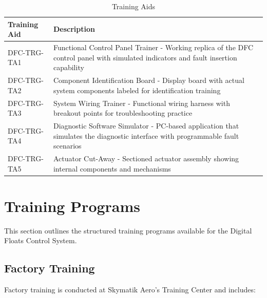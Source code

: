 \documentclass[12pt,a4paper,twoside,openright]{book}
\newcommand{\tabletextfont}{\normalfont\rmfamily}
\newcommand{\tableheadfont}{\normalfont\bfseries}
\begin{document}
\begin{table}[h]
\centering
\setlength{\tabcolsep}{5pt} %
\begin{tabular}{|p{}|p{}|}
\hline
\tableheadfont\textbf{Training Aid} & \tableheadfont\textbf{Description} \\
\hline
\tabletextfont DFC-TRG-TA1 & Functional Control Panel Trainer - Working replica of the DFC control panel with simulated indicators and fault insertion capability \\
\hline
\tabletextfont DFC-TRG-TA2 & Component Identification Board - Display board with actual system components labeled for identification training \\
\hline
\tabletextfont DFC-TRG-TA3 & System Wiring Trainer - Functional wiring harness with breakout points for troubleshooting practice \\
\hline
\tabletextfont DFC-TRG-TA4 & Diagnostic Software Simulator - PC-based application that simulates the diagnostic interface with programmable fault scenarios \\
\hline
\tabletextfont DFC-TRG-TA5 & Actuator Cut-Away - Sectioned actuator assembly showing internal components and mechanisms \\
\hline
\end{tabular}
\caption{Training Aids}
\end{table}

\section{Training Programs}

This section outlines the structured training programs available for the Digital Floats Control System.

\subsection{Factory Training}

Factory training is conducted at Skymatik Aero's Training Center and includes:
\end{document}
